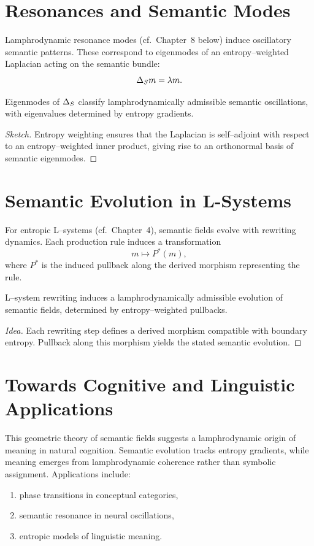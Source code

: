 \section{Resonances and Semantic Modes}

Lamphrodynamic resonance modes (cf.\ Chapter~8 below) induce oscillatory
semantic patterns. These correspond to eigenmodes of an
entropy–weighted Laplacian acting on the semantic bundle:
\[
  \Delta_{S} m = \lambda m.
\]

\begin{proposition}
Eigenmodes of $\Delta_{S}$ classify lamphrodynamically admissible
semantic oscillations, with eigenvalues determined by entropy gradients.
\end{proposition}

\begin{proof}[Sketch]
Entropy weighting ensures that the Laplacian is self–adjoint with
respect to an entropy–weighted inner product, giving rise to an
orthonormal basis of semantic eigenmodes.
\end{proof}


\section{Semantic Evolution in L-Systems}

For entropic L–systems (cf.\ Chapter~4), semantic fields evolve with
rewriting dynamics. Each production rule induces a transformation
\[
  m \longmapsto P^\ast(m),
\]
where $P^\ast$ is the induced pullback along the derived morphism
representing the rule.

\begin{proposition}
L–system rewriting induces a lamphrodynamically admissible evolution of
semantic fields, determined by entropy–weighted pullbacks.
\end{proposition}

\begin{proof}[Idea]
Each rewriting step defines a derived morphism compatible with boundary
entropy. Pullback along this morphism yields the stated semantic
evolution.
\end{proof}


\section{Towards Cognitive and Linguistic Applications}

This geometric theory of semantic fields suggests a lamphrodynamic
origin of meaning in natural cognition. Semantic evolution tracks
entropy gradients, while meaning emerges from lamphrodynamic coherence
rather than symbolic assignment. Applications include:
\begin{enumerate}
\item phase transitions in conceptual categories,
\item semantic resonance in neural oscillations,
\item entropic models of linguistic meaning.
\end{enumerate}

